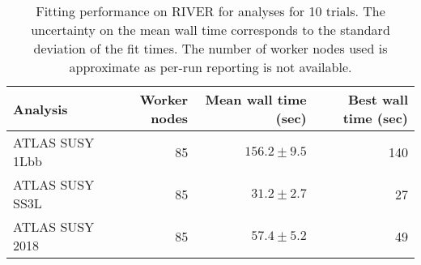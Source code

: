\begin{table}[htpb]
\centering
\caption{Fitting performance on RIVER for analyses for 10 trials. The uncertainty on the mean wall time corresponds to the standard deviation of the fit times. The number of worker nodes used is approximate as per-run reporting is not available.}
\label{table:performance}
\begin{tabular}{@{}lrrr@{}}
\toprule
       Analysis & Worker nodes & Mean wall time (sec) & Best wall time (sec) \\
\midrule
ATLAS SUSY 1Lbb &           85 &        $156.2\pm9.5$ &                  140 \\
ATLAS SUSY SS3L &           85 &         $31.2\pm2.7$ &                   27 \\
ATLAS SUSY 2018 &           85 &         $57.4\pm5.2$ &                   49 \\
\bottomrule
\end{tabular}
\end{table}
